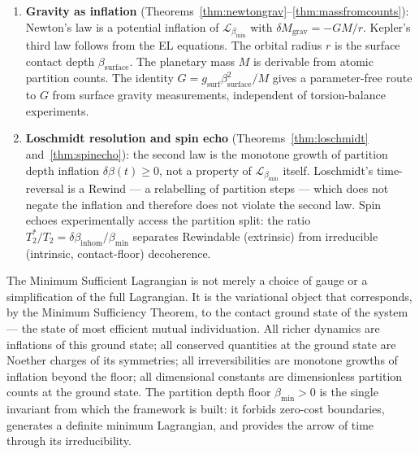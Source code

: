 \documentclass[12pt, a4paper]{article}
\theoremstyle{plain}
\theoremstyle{definition}
\theoremstyle{remark}
\newcommand{\bmin}{\beta_{\min}}
\newcommand{\Lmin}{\mathcal{L}_{\bmin}}
\begin{document}
\begin{enumerate}
\item \textbf{Gravity as inflation} (Theorems~\ref{thm:newtongrav}--\ref{thm:massfromcounts}):
  Newton's law is a potential inflation of $\Lmin$ with $\delta M_{\mathrm{grav}}
  = -GM/r$. Kepler's third law follows from the EL equations. The orbital
  radius $r$ is the surface contact depth $\beta_{\mathrm{surface}}$. The
  planetary mass $M$ is derivable from atomic partition counts. The identity
  $G = g_{\mathrm{surf}}\beta_{\mathrm{surface}}^2/M$ gives a parameter-free
  route to $G$ from surface gravity measurements, independent of torsion-balance
  experiments.

\item \textbf{Loschmidt resolution and spin echo} (Theorems~\ref{thm:loschmidt}
  and~\ref{thm:spinecho}): the second law is the monotone growth of partition
  depth inflation $\delta\beta(t) \geq 0$, not a property of $\Lmin$ itself.
  Loschmidt's time-reversal is a Rewind --- a relabelling of partition steps
  --- which does not negate the inflation and therefore does not violate the
  second law. Spin echoes experimentally access the partition split: the ratio
  $T_2^*/T_2 = \delta\beta_{\mathrm{inhom}}/\bmin$ separates Rewindable
  (extrinsic) from irreducible (intrinsic, contact-floor) decoherence.
\end{enumerate}

The Minimum Sufficient Lagrangian is not merely a choice of gauge or a
simplification of the full Lagrangian. It is the variational object that
corresponds, by the Minimum Sufficiency Theorem, to the contact ground state
of the system --- the state of most efficient mutual individuation. All richer
dynamics are inflations of this ground state; all conserved quantities at the
ground state are Noether charges of its symmetries; all irreversibilities are
monotone growths of inflation beyond the floor; all dimensional constants are
dimensionless partition counts at the ground state. The partition depth floor
$\bmin > 0$ is the single invariant from which the framework is built: it
forbids zero-cost boundaries, generates a definite minimum Lagrangian, and
provides the arrow of time through its irreducibility.



\end{document}
